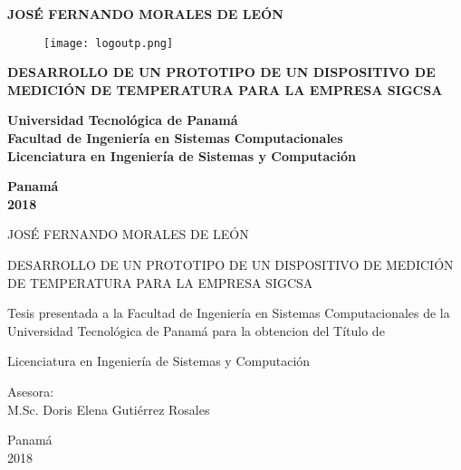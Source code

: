 \thispagestyle{empty}
\begin{center}
	
	\large
	
	\textbf{JOSÉ FERNANDO MORALES DE LEÓN}
	
	\vfill
	
	\begin{figure}[H]
		\centering
		\texttt{[image: logoutp.png]}
	\end{figure}

	\vfill
	
	\textbf{DESARROLLO DE UN PROTOTIPO DE UN DISPOSITIVO DE
	MEDICIÓN DE TEMPERATURA PARA LA EMPRESA SIGCSA}
	
	\vfill
	
	\textbf{Universidad Tecnológica de Panamá \\
	Facultad de Ingeniería en Sistemas Computacionales \\
	Licenciatura en Ingeniería de Sistemas y Computación}
	
	\vfill
	
	\textbf{Panamá\\
	2018}
		
\end{center}
\clearpage

\thispagestyle{headings}
\mbox{}
\clearpage

\thispagestyle{empty}

\begin{center}

\large
JOSÉ FERNANDO MORALES DE LEÓN

\vfill

DESARROLLO DE UN PROTOTIPO DE UN DISPOSITIVO DE
MEDICIÓN DE TEMPERATURA PARA LA EMPRESA SIGCSA

\vfill

Tesis presentada a la Facultad de Ingeniería en Sistemas
Computacionales de la Universidad Tecnológica de Panamá
para la obtencion del Título de

\vfill

Licenciatura en Ingeniería de Sistemas y Computación

\vfill

Asesora:\\
M.Sc. Doris Elena Gutiérrez Rosales

\vfill
Panamá\\
2018

\end{center}

\clearpage

